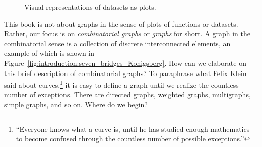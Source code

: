 \begin{figure}[!htbp]
\centering
{}
\quad
{}
\caption{Visual representations of datasets as plots.}
\label{fig:introduction:graphs_as_plots}
\end{figure}

This book is not about graphs in the sense of plots of functions or
datasets. Rather, our focus is on
\emph{combinatorial graphs} or
\emph{graphs} for short. A graph in the combinatorial sense is a
collection of discrete interconnected elements, an example of which is
shown in Figure~\ref{fig:introduction:seven_bridges_Konigsberg}. How
can we elaborate on this brief description of combinatorial graphs? To
paraphrase what Felix Klein said about
curves,\footnote{
  ``Everyone knows what a curve is, until he has studied enough
  mathematics to become confused through the countless number of
  possible exceptions.''
}
it is easy to define a graph until we realize the countless number of
exceptions. There are directed graphs, weighted graphs, multigraphs,
simple graphs, and so on. Where do we begin?

